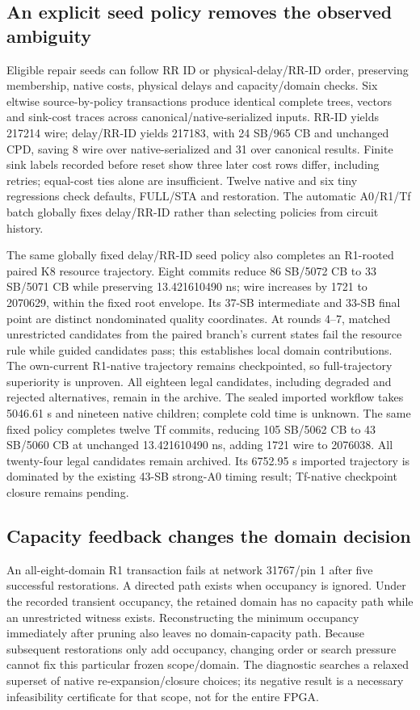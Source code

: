 \documentclass[conference,10pt]{IEEEtran}
\begin{document}
\subsection{An explicit seed policy removes the observed ambiguity}
Eligible repair seeds can follow RR ID or physical-delay/RR-ID order, preserving membership, native costs, physical delays and capacity/domain checks. Six eltwise source-by-policy transactions produce identical complete trees, vectors and sink-cost traces across canonical/native-serialized inputs. RR-ID yields 217214 wire; delay/RR-ID yields 217183, with 24 SB/965 CB and unchanged CPD, saving 8 wire over native-serialized and 31 over canonical results. Finite sink labels recorded before reset show three later cost rows differ, including retries; equal-cost ties alone are insufficient. Twelve native and six tiny regressions check defaults, FULL/STA and restoration. The automatic A0/R1/Tf batch globally fixes delay/RR-ID rather than selecting policies from circuit history.

The same globally fixed delay/RR-ID seed policy also completes an R1-rooted paired K8 resource trajectory. Eight commits reduce 86 SB/5072 CB to 33 SB/5071 CB while preserving 13.421610490 ns; wire increases by 1721 to 2070629, within the fixed root envelope. Its 37-SB intermediate and 33-SB final point are distinct nondominated quality coordinates. At rounds 4--7, matched unrestricted candidates from the paired branch's current states fail the resource rule while guided candidates pass; this establishes local domain contributions. The own-current R1-native trajectory remains checkpointed, so full-trajectory superiority is unproven. All eighteen legal candidates, including degraded and rejected alternatives, remain in the archive. The sealed imported workflow takes 5046.61 s and nineteen native children; complete cold time is unknown. The same fixed policy completes twelve Tf commits, reducing 105 SB/5062 CB to 43 SB/5060 CB at unchanged 13.421610490 ns, adding 1721 wire to 2076038. All twenty-four legal candidates remain archived. Its 6752.95 s imported trajectory is dominated by the existing 43-SB strong-A0 timing result; Tf-native checkpoint closure remains pending.

\subsection{Capacity feedback changes the domain decision}
An all-eight-domain R1 transaction fails at network 31767/pin 1 after five successful restorations. A directed path exists when occupancy is ignored. Under the recorded transient occupancy, the retained domain has no capacity path while an unrestricted witness exists. Reconstructing the minimum occupancy immediately after pruning also leaves no domain-capacity path. Because subsequent restorations only add occupancy, changing order or search pressure cannot fix this particular frozen scope/domain. The diagnostic searches a relaxed superset of native re-expansion/closure choices; its negative result is a necessary infeasibility certificate for that scope, not for the entire FPGA.
\end{document}
